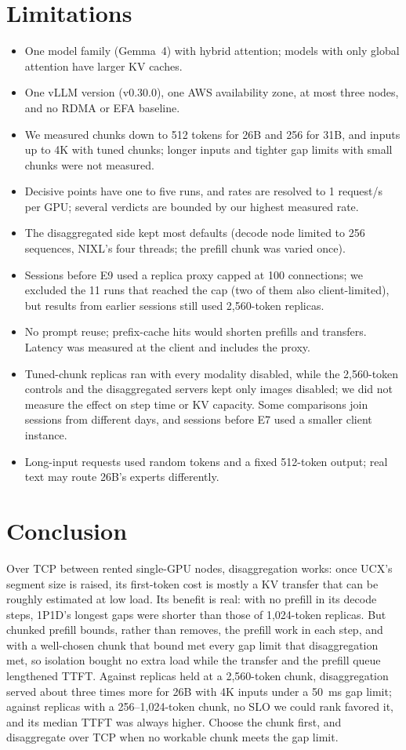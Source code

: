 \documentclass[11pt]{article}
\begin{document}
\section{Limitations}
\begin{itemize}
  \item One model family (Gemma~4) with hybrid attention; models with only global attention have larger KV caches.
  \item One vLLM version (v0.30.0), one AWS availability zone, at most three nodes, and no RDMA or EFA baseline.
  \item We measured chunks down to 512 tokens for 26B and 256 for 31B, and inputs up to 4K with tuned chunks; longer inputs and tighter gap limits with small chunks were not measured.
  \item Decisive points have one to five runs, and rates are resolved to 1 request/s per GPU; several verdicts are bounded by our highest measured rate.
  \item The disaggregated side kept most defaults (decode node limited to 256 sequences, NIXL's four threads; the prefill chunk was varied once).
  \item Sessions before E9 used a replica proxy capped at 100 connections; we excluded the 11 runs that reached the cap (two of them also client-limited), but results from earlier sessions still used 2,560-token replicas.
  \item No prompt reuse; prefix-cache hits would shorten prefills and transfers. Latency was measured at the client and includes the proxy.
  \item Tuned-chunk replicas ran with every modality disabled, while the 2,560-token controls and the disaggregated servers kept only images disabled; we did not measure the effect on step time or KV capacity. Some comparisons join sessions from different days, and sessions before E7 used a smaller client instance.
  \item Long-input requests used random tokens and a fixed 512-token output; real text may route 26B's experts differently.
\end{itemize}

\section{Conclusion}
Over TCP between rented single-GPU nodes, disaggregation works: once UCX's segment size is raised, its first-token cost is mostly a KV transfer that can be roughly estimated at low load. Its benefit is real: with no prefill in its decode steps, 1P1D's longest gaps were shorter than those of 1,024-token replicas. But chunked prefill bounds, rather than removes, the prefill work in each step, and with a well-chosen chunk that bound met every gap limit that disaggregation met, so isolation bought no extra load while the transfer and the prefill queue lengthened TTFT. Against replicas held at a 2,560-token chunk, disaggregation served about three times more for 26B with 4K inputs under a 50~ms gap limit; against replicas with a 256--1,024-token chunk, no SLO we could rank favored it, and its median TTFT was always higher. Choose the chunk first, and disaggregate over TCP when no workable chunk meets the gap limit.
\end{document}
